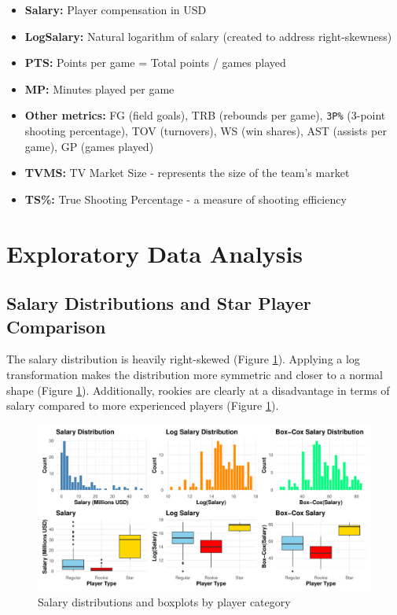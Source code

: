 \documentclass[
  11pt,
]{article}
\providecommand{\tightlist}{%
  \setlength{\itemsep}{0pt}\setlength{\parskip}{0pt}}
\begin{document}
\begin{itemize}
\tightlist
\item
  \textbf{Salary:} Player compensation in USD
\item
  \textbf{LogSalary:} Natural logarithm of salary (created to address right-skewness)
\item
  \textbf{PTS:} Points per game = Total points / games played
\item
  \textbf{MP:} Minutes played per game
\item
  \textbf{Other metrics:} FG (field goals), TRB (rebounds per game), \texttt{3P\%} (3-point shooting percentage), TOV (turnovers), WS (win shares), AST (assists per game), GP (games played)
\item
  \textbf{TVMS:} TV Market Size - represents the size of the team's market
\item
  \textbf{TS\%:} True Shooting Percentage - a measure of shooting efficiency
\end{itemize}

\hypertarget{exploratory-data-analysis}{%
\section{Exploratory Data Analysis}\label{exploratory-data-analysis}}

\hypertarget{salary-distributions-and-star-player-comparison}{%
\subsection{Salary Distributions and Star Player Comparison}\label{salary-distributions-and-star-player-comparison}}

The salary distribution is heavily right-skewed (Figure \ref{fig:salary-distributions}). Applying a log transformation makes the distribution more symmetric and closer to a normal shape (Figure \ref{fig:salary-distributions}). Additionally, rookies are clearly at a disadvantage in terms of salary compared to more experienced players (Figure \ref{fig:salary-distributions}).

\begin{figure}
\centering
\includegraphics{lab2_report_short_files/figure-latex/salary-distributions-1.pdf}
\caption{\label{fig:salary-distributions}Salary distributions and boxplots by player category}
\end{figure}
\end{document}
